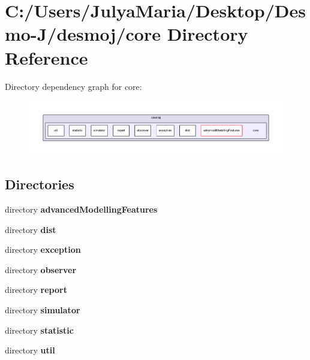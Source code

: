 \section{C\-:/\-Users/\-Julya\-Maria/\-Desktop/\-Desmo-\/\-J/desmoj/core Directory Reference}
\label{dir_39ac9d908af16ade4aa4f4beaa85f138}
Directory dependency graph for core\-:
\nopagebreak
\begin{figure}[H]
\begin{center}
\leavevmode
\includegraphics[width=350pt]{dir_39ac9d908af16ade4aa4f4beaa85f138_dep}
\end{center}
\end{figure}
\subsection*{Directories}
\begin{DoxyCompactItemize}
\item 
directory {\bf advanced\-Modelling\-Features}
\item 
directory {\bf dist}
\item 
directory {\bf exception}
\item 
directory {\bf observer}
\item 
directory {\bf report}
\item 
directory {\bf simulator}
\item 
directory {\bf statistic}
\item 
directory {\bf util}
\end{DoxyCompactItemize}
